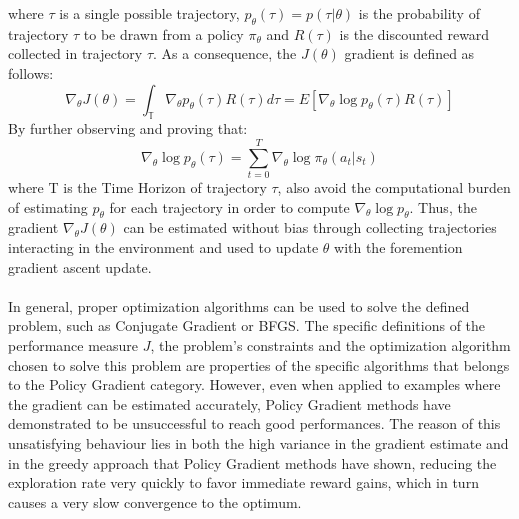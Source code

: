                 where $\tau$ is a single possible trajectory, $p_{\theta}(\tau) = p(\tau|\theta)$ is the probability of trajectory $\tau$ to be drawn from a policy $\pi_{\theta}$ and $R(\tau)$ is the discounted reward collected in trajectory $\tau$. As a consequence, the $J(\theta)$ gradient is defined as follows:
                \[ \nabla_{\theta} J(\theta) = \int_{\mathbb{T}} \nabla_{\theta} p_{\theta} (\tau) R(\tau) d\tau = E \left[ \nabla_{\theta} \log p_{\theta}(\tau) R(\tau) \right]\]
                By further observing and proving that:
                \[ \nabla_{\theta} \log p_{\theta}(\tau) = \sum_{t=0}^{T} \nabla_{\theta} \log \pi_\theta (a_t | s_t) \]
                where T is the Time Horizon of trajectory $\tau$,  also avoid the computational burden of estimating $p_{\theta}$ for each trajectory in order to compute $\nabla_{\theta} \log p_{\theta}$. Thus, the gradient $\nabla_{\theta} J(\theta)$ can be estimated without bias through collecting trajectories interacting in the environment and used to update $\theta$ with the foremention gradient ascent update.
                \\\\
                In general, proper optimization algorithms can be used to solve the defined problem, such as Conjugate Gradient or BFGS. The specific definitions of the performance measure $J$, the problem's constraints and the optimization algorithm chosen to solve this problem are properties of the specific algorithms that belongs to the Policy Gradient category. However, even when applied to examples where the gradient can be estimated accurately, Policy Gradient methods have demonstrated to be unsuccessful to reach good performances. The reason of this unsatisfying behaviour lies in both the high variance in the gradient estimate and in the greedy approach that Policy Gradient methods have shown, reducing the exploration rate very quickly to favor immediate reward gains, which in turn causes a very slow convergence to the optimum. 
                
